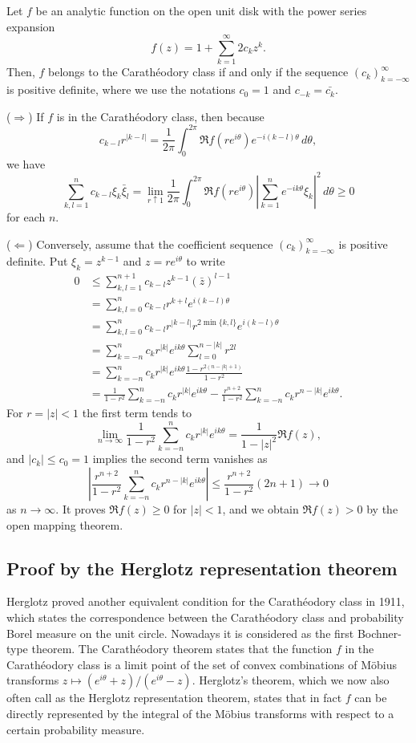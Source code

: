 \documentclass[a4paper]{article}
\begin{document}
\begin{thm}
Let $f$ be an analytic function on the open unit disk with the power series expansion
\[f(z)=1+\sum_{k=1}^\infty2c_kz^k.\]
Then, $f$ belongs to the Carath\'eodory class if and only if the sequence $(c_k)_{k=-\infty}^\infty$ is positive definite, where we use the notations $c_0=1$ and $c_{-k}=\bar{c_k}$.
\end{thm}
\begin{pf}
($\Rightarrow$)
If $f$ is in the Carath\'eodory class, then because
\[c_{k-l}r^{|k-l|}=\frac1{2\pi}\int_0^{2\pi}\Re f(re^{i\theta})e^{-i(k-l)\theta}\,d\theta,\]
we have
\[\sum_{k,l=1}^nc_{k-l}\xi_k\bar\xi_l
=\lim_{r\uparrow1}\frac1{2\pi}\int_0^{2\pi}\Re f(re^{i\theta})\left|\sum_{k=1}^ne^{-ik\theta}\xi_k\right|^2\,d\theta\ge0\]
for each $n$.

($\Leftarrow$)
Conversely, assume that the coefficient sequence $(c_k)_{k=-\infty}^\infty$ is positive definite.
Put $\xi_k=z^{k-1}$ and $z=re^{i\theta}$ to write
\begin{align*}
0&\le\sum_{k,l=1}^{n+1}c_{k-l}z^{k-1}(\bar z)^{l-1}\\
&=\sum_{k,l=0}^nc_{k-l}r^{k+l}e^{i(k-l)\theta}\\
&=\sum_{k,l=0}^nc_{k-l}r^{|k-l|}r^{2\min\{k,l\}}e^{i(k-l)\theta}\\
&=\sum_{k=-n}^nc_kr^{|k|}e^{ik\theta}\sum_{l=0}^{n-|k|}r^{2l}\\
&=\sum_{k=-n}^nc_kr^{|k|}e^{ik\theta}\frac{1-r^{2(n-|k|+1)}}{1-r^2}\\
&=\frac1{1-r^2}\sum_{k=-n}^nc_kr^{|k|}e^{ik\theta}
-\frac{r^{n+2}}{1-r^2}\sum_{k=-n}^nc_kr^{n-|k|}e^{ik\theta}.
\end{align*}
For $r=|z|<1$ the first term tends to
\[\lim_{n\to\infty}\frac1{1-r^2}\sum_{k=-n}^nc_kr^{|k|}e^{ik\theta}=\frac1{1-|z|^2}\Re f(z),\]
and $|c_k|\le c_0=1$ implies the second term vanishes as
\[\left|\frac{r^{n+2}}{1-r^2}\sum_{k=-n}^nc_kr^{n-|k|}e^{ik\theta}\right|\le\frac{r^{n+2}}{1-r^2}(2n+1)\to0\]
as $n\to\infty$.
It proves $\Re f(z)\ge0$ for $|z|<1$, and we obtain $\Re f(z)>0$ by the open mapping theorem.
\end{pf}


\subsection{Proof by the Herglotz representation theorem}

Herglotz \cite{herglotz1911uber} proved another equivalent condition for the Carath\'eodory class in 1911, which states the correspondence between the Carath\'eodory class and probability Borel measure on the unit circle.
Nowadays it is considered as the first Bochner-type theorem.
The Carath\'eodory theorem states that the function $f$ in the Carath\'eodory class is a limit point of the set of convex combinations of M\"obius transforms $z\mapsto(e^{i\theta}+z)/(e^{i\theta}-z)$.
Herglotz's theorem, which we now also often call as the Herglotz representation theorem, states that in fact $f$ can be directly represented by the integral of the M\"obius transforms with respect to a certain probability measure.
\end{document}
